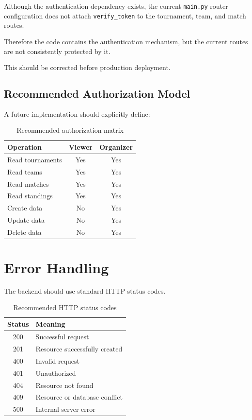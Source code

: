 \documentclass[12pt,a4paper]{article}
\begin{document}
Although the authentication dependency exists, the current
\texttt{main.py} router configuration does not attach
\texttt{verify\_token} to the tournament, team, and match routes.

Therefore the code contains the authentication mechanism, but the
current routes are not consistently protected by it.

This should be corrected before production deployment.

\subsection{Recommended Authorization Model}

A future implementation should explicitly define:

\begin{table}[H]
\centering
\begin{tabular}{lcc}
\toprule
\textbf{Operation} & \textbf{Viewer} & \textbf{Organizer}\\
\midrule
Read tournaments & Yes & Yes\\
Read teams & Yes & Yes\\
Read matches & Yes & Yes\\
Read standings & Yes & Yes\\
Create data & No & Yes\\
Update data & No & Yes\\
Delete data & No & Yes\\
\bottomrule
\end{tabular}
\caption{Recommended authorization matrix}
\end{table}


\section{Error Handling}

The backend should use standard HTTP status codes.

\begin{table}[H]
\centering
\begin{tabular}{cl}
\toprule
\textbf{Status} & \textbf{Meaning}\\
\midrule
200 & Successful request\\
201 & Resource successfully created\\
400 & Invalid request\\
401 & Unauthorized\\
404 & Resource not found\\
409 & Resource or database conflict\\
500 & Internal server error\\
\bottomrule
\end{tabular}
\caption{Recommended HTTP status codes}
\end{table}
\end{document}
